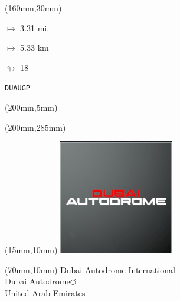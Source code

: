 \begin{textblock*}{40mm}(160mm,30mm)%
\Large
\par$\mapsto$ 3.31 mi.
\par$\mapsto$ 5.33 km
\par$\looparrowright$ 18
\par\hfill\tiny\tt DUAUGP\\
\end{textblock*}
\begin{textblock*}{20mm}(200mm,5mm)%
\fbox{\thepage}
\label{DUAUGP}
\end{textblock*}
\begin{textblock*}{20mm}(200mm,285mm)%
\fbox{\thepage}
\end{textblock*}

\null\newpage
\begin{textblock*}{50mm}(15mm,10mm)%
\includegraphics[width=50mm]{LG/2015-05-20_00081.png}
\end{textblock*}
\begin{textblock*}{130mm}(70mm,10mm)%
{\fontsize{20}{20}\selectfont Dubai Autodrome International\\}
{\fontsize{16}{16}\selectfont Dubai Autodrome\hfill \huge$\circlearrowleft$\\}
{\fontsize{12}{12}\selectfont United Arab Emirates\\}
\end{textblock*}
